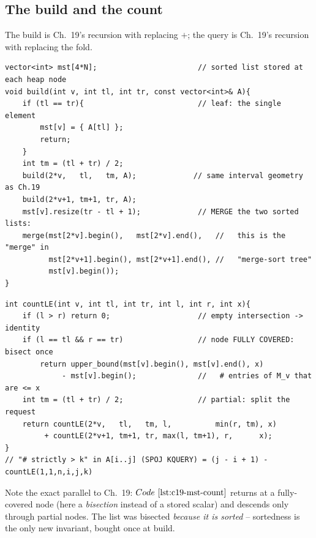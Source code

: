 \subsection{The build and the count}

The build is Ch.~19's recursion with  replacing \(+\); the query is Ch.~19's recursion with  replacing the fold.

\begin{lstlisting}[caption={merge-sort tree build: leaves hold one value, internal nodes MERGE the two sorted child lists -- O(n log n) total}, label={lst:c19-mst-build}]
vector<int> mst[4*N];                       // sorted list stored at each heap node
void build(int v, int tl, int tr, const vector<int>& A){
    if (tl == tr){                          // leaf: the single element
        mst[v] = { A[tl] };
        return;
    }
    int tm = (tl + tr) / 2;
    build(2*v,   tl,   tm, A);             // same interval geometry as Ch.19
    build(2*v+1, tm+1, tr, A);
    mst[v].resize(tr - tl + 1);             // MERGE the two sorted lists:
    merge(mst[2*v].begin(),   mst[2*v].end(),   //   this is the "merge" in
          mst[2*v+1].begin(), mst[2*v+1].end(), //   "merge-sort tree"
          mst[v].begin());
}
\end{lstlisting}

\begin{lstlisting}[caption={range count: number of elements at most x in A(l..r) equals one bisection per canonical node -- O(log-squared n)}, label={lst:c19-mst-count}]
int countLE(int v, int tl, int tr, int l, int r, int x){
    if (l > r) return 0;                    // empty intersection -> identity
    if (l == tl && r == tr)                 // node FULLY COVERED: bisect once
        return upper_bound(mst[v].begin(), mst[v].end(), x)
             - mst[v].begin();              //   # entries of M_v that are <= x
    int tm = (tl + tr) / 2;                 // partial: split the request
    return countLE(2*v,   tl,   tm, l,          min(r, tm), x)
         + countLE(2*v+1, tm+1, tr, max(l, tm+1), r,      x);
}
// "# strictly > k" in A[i..j] (SPOJ KQUERY) = (j - i + 1) - countLE(1,1,n,i,j,k)
\end{lstlisting}

Note the exact parallel to Ch.~19: \(\coderef{c19-mst-count}\) returns at a fully-covered node (here a \emph{bisection} instead of a stored scalar) and descends only through partial nodes.  The list was bisected \emph{because it is sorted} -- sortedness is the only new invariant, bought once at build.

